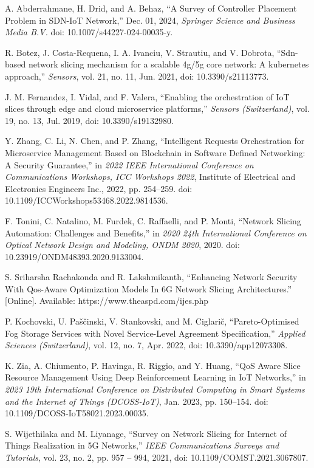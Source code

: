 \cite{b19} A. Abderrahmane, H. Drid, and A. Behaz, ``A Survey of Controller Placement Problem in SDN-IoT Network,'' Dec. 01, 2024, \emph{Springer Science and Business Media B.V.} doi: 10.1007/s44227-024-00035-y.

\cite{b20} R. Botez, J. Costa-Requena, I. A. Ivanciu, V. Strautiu, and V. Dobrota, ``Sdn-based network slicing mechanism for a scalable 4g/5g core network: A kubernetes approach,'' \emph{Sensors}, vol. 21, no. 11, Jun. 2021, doi: 10.3390/s21113773.

\cite{b21} J. M. Fernandez, I. Vidal, and F. Valera, ``Enabling the orchestration of IoT slices through edge and cloud microservice platforms,'' \emph{Sensors (Switzerland)}, vol. 19, no. 13, Jul. 2019, doi: 10.3390/s19132980.

\cite{b22} Y. Zhang, C. Li, N. Chen, and P. Zhang, ``Intelligent Requests Orchestration for Microservice Management Based on Blockchain in Software Defined Networking: A Security Guarantee,'' in \emph{2022 IEEE International Conference on Communications Workshops, ICC Workshops 2022}, Institute of Electrical and Electronics Engineers Inc., 2022, pp. 254--259. doi: 10.1109/ICCWorkshops53468.2022.9814536.

\cite{b23} F. Tonini, C. Natalino, M. Furdek, C. Raffaelli, and P. Monti, ``Network Slicing Automation: Challenges and Benefits,'' in \emph{2020 24th International Conference on Optical Network Design and Modeling, ONDM 2020}, 2020. doi: 10.23919/ONDM48393.2020.9133004.

\cite{b24} S. Sriharsha Rachakonda and R. Lakshmikanth, ``Enhancing Network Security With Qos-Aware Optimization Models In 6G Network Slicing Architectures.'' {[}Online{]}. Available: https://www.theaspd.com/ijes.php

\cite{b25} P. Kochovski, U. Paščinski, V. Stankovski, and M. Ciglarič, ``Pareto-Optimised Fog Storage Services with Novel Service-Level Agreement Specification,'' \emph{Applied Sciences (Switzerland)}, vol. 12, no. 7, Apr. 2022, doi: 10.3390/app12073308.

\cite{b26} K. Zia, A. Chiumento, P. Havinga, R. Riggio, and Y. Huang, ``QoS Aware Slice Resource Management Using Deep Reinforcement Learning in IoT Networks,'' in \emph{2023 19th International Conference on Distributed Computing in Smart Systems and the Internet of Things (DCOSS-IoT)}, Jan. 2023, pp. 150--154. doi: 10.1109/DCOSS-IoT58021.2023.00035.

\cite{b27} S. Wijethilaka and M. Liyanage, ``Survey on Network Slicing for Internet of Things Realization in 5G Networks,'' \emph{IEEE Communications Surveys and Tutorials}, vol. 23, no. 2, pp. 957 -- 994, 2021, doi: 10.1109/COMST.2021.3067807.

